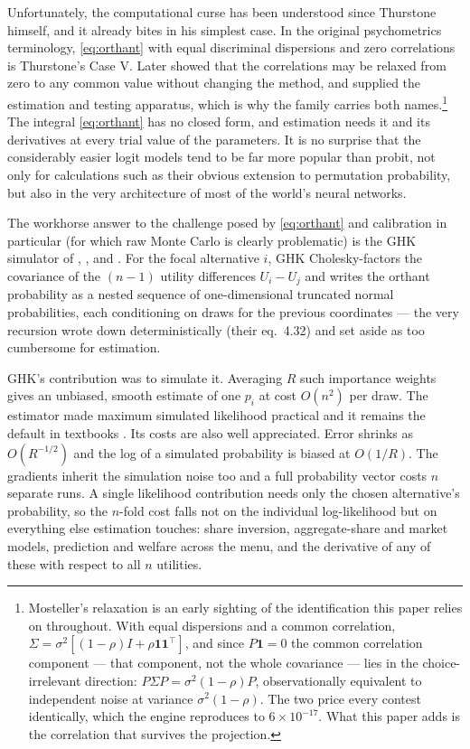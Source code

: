 \documentclass[11pt]{article}
\begin{document}
Unfortunately, the computational curse has been understood since Thurstone himself,
and it already bites in his simplest case. In the original psychometrics
terminology, \eqref{eq:orthant} with equal discriminal dispersions and
zero correlations is Thurstone's Case V. Later \citet{mosteller1951} showed
that the correlations may be relaxed from zero to any common value without
changing the method, and supplied the estimation and testing apparatus,
which is why the family carries both names.\footnote{Mosteller's
relaxation is an early sighting of the identification this paper relies
on throughout. With equal dispersions and a common correlation,
$\Sigma=\sigma^2[(1-\rho)I+\rho\mathbf{1}\mathbf{1}^{\top}]$, and since
$P\mathbf{1}=0$ the common correlation component --- that component, not
the whole covariance --- lies in the choice-irrelevant direction:
$P\Sigma P=\sigma^2(1-\rho)P$, observationally equivalent to independent
noise at variance $\sigma^2(1-\rho)$. The two price every contest
identically, which the engine reproduces to $6\times10^{-17}$. What this
paper adds is the correlation that survives the projection.} The integral \eqref{eq:orthant} has no closed form, and estimation
needs it and its derivatives at every trial value of the parameters. It is no surprise that the considerably easier logit models tend to be far more popular than probit, not only for calculations such as their obvious extension to permutation probability, but also in the very architecture of most of the world's neural networks.

The workhorse answer to the challenge posed by \eqref{eq:orthant} and calibration in particular (for which raw Monte Carlo is clearly problematic) is the GHK simulator of \citet{geweke1989},
\citet{borschsupan1993}, \citet{keane1994} and \citet{hajivassiliou1996}. For
the focal alternative $i$, GHK Cholesky-factors the covariance of the
$(n-1)$ utility differences $U_i-U_j$ and writes the orthant probability
as a nested sequence of one-dimensional truncated normal probabilities,
each conditioning on draws for the previous coordinates --- the very
recursion \citet{domencich1975} wrote down deterministically (their
eq.~4.32) and set aside as too cumbersome for estimation.

GHK's contribution was to simulate it. Averaging $R$ such importance weights gives an
unbiased, smooth estimate of one $p_i$ at cost $O(n^2)$ per draw. The estimator
made maximum simulated likelihood practical and it remains the default in
textbooks \citep{train2009}. Its costs are also well appreciated. Error shrinks as
$O(R^{-1/2})$ and the log of a simulated probability is biased at $O(1/R)$. The
gradients inherit the simulation noise too and a full probability vector costs
$n$ separate runs. A single likelihood contribution needs only the chosen
alternative's probability, so the $n$-fold cost falls not on the individual
log-likelihood but on everything else estimation touches: share inversion,
aggregate-share and market models, prediction and welfare across the menu,
and the derivative of any of these with respect to all $n$ utilities.
\end{document}
